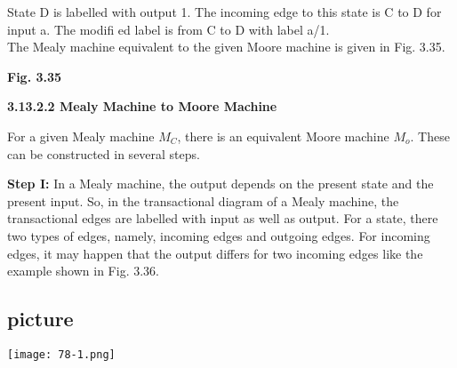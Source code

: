 \documentclass[9pt]{beamer}
\begin{document}
\begin{frame}
 \hspace*{0.2cm} State D is labelled with output 1. The incoming edge to this state is C to D for input a. The modifi ed
label is from C to D with label a/1.\\
 \hspace*{0.2cm} The Mealy machine equivalent to the given Moore machine is given in Fig. 3.35.
 \pause
\begin{center}
\end{center}
\begin{center}
\textbf{Fig. 3.35}
\end{center}

\vspace*{0.1cm}
\pause
\textbf{3.13.2.2 Mealy Machine to Moore Machine}

\vspace*{0.2cm}
For a given Mealy machine $M_C$, there is an equivalent Moore machine
$M_o$. These can be constructed in several steps.\\

\vspace*{0.2cm}
\end{frame}

\begin{frame}
\textbf{Step I:} In a Mealy machine, the output depends on the present state and
the present input. So, in the transactional diagram of a Mealy machine,
the transactional edges are labelled with input as well as output. For a
state, there two types of edges, namely, incoming edges and outgoing
edges. For incoming edges, it may happen that the output differs for two
incoming edges like the example shown in Fig. 3.36.\\

\pause
\begin{center}
\section{picture}
\texttt{[image: 78-1.png]}
\end{center}
\end{frame}
\end{document}

